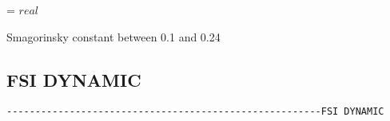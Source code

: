 \noindent{} = $real$

Smagorinsky constant between 0.1 and 0.24



\subsection{FSI DYNAMIC}
\begin{verbatim}
-------------------------------------------------------FSI DYNAMIC
\end{verbatim}















